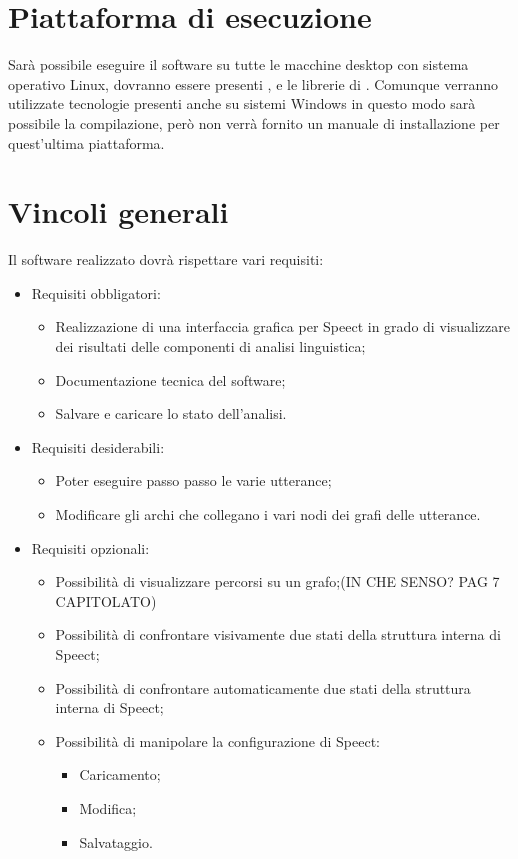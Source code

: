 \documentclass[../AnalisideiRequisiti.tex]{subfiles}
\begin{document}
\section{Piattaforma di esecuzione}
Sarà possibile eseguire il software su tutte le macchine desktop con sistema operativo Linux, dovranno essere presenti ,  e le librerie di . Comunque verranno utilizzate tecnologie presenti anche su sistemi Windows in questo modo sarà possibile la compilazione, però non verrà fornito un manuale di installazione per quest’ultima piattaforma.

\section{Vincoli generali}
Il software realizzato dovrà rispettare vari requisiti:
\begin{itemize}
	\item{} Requisiti obbligatori:
	\begin{itemize}
		\item{}Realizzazione di una interfaccia grafica per Speect in grado di visualizzare dei risultati delle componenti di analisi linguistica;
		\item{}	Documentazione tecnica del software;
		\item{}Salvare e caricare lo stato dell’analisi.
	\end{itemize}
	\item{} Requisiti desiderabili:
	\begin{itemize}
		\item{} Poter eseguire passo passo le varie utterance;
		\item{}	Modificare gli archi che collegano i vari nodi dei grafi delle utterance.
	\end{itemize}
	\item{} Requisiti opzionali:
	\begin{itemize}
		\item{} Possibilità di visualizzare percorsi su un grafo;(IN CHE SENSO? PAG 7 CAPITOLATO)
		\item{}	Possibilità di confrontare visivamente due stati della struttura interna di Speect;
		\item{} Possibilità di confrontare automaticamente due stati della struttura interna di Speect;
		\item{}	Possibilità di manipolare la configurazione di Speect:
		\begin{itemize}
			\item{} Caricamento;
			\item{}	Modifica;
			\item{} Salvataggio.
		\end{itemize}
	\end{itemize}
	
\end{itemize}
\end{document}
